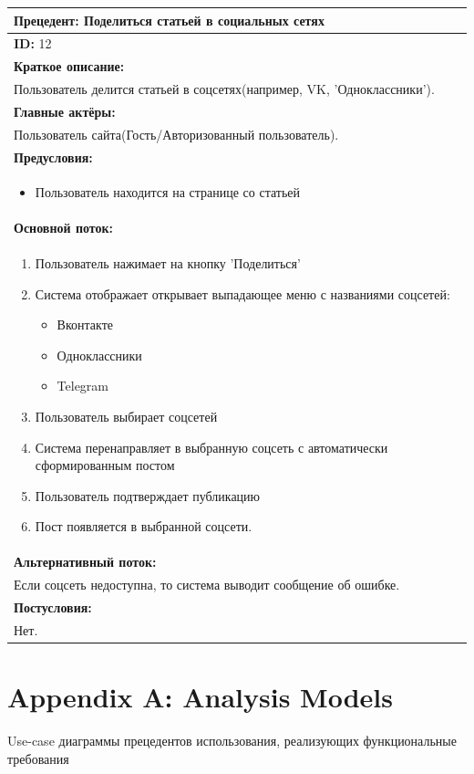 \documentclass{scrreprt}
\begin{document}
\vspace{10px}
\noindent
\begin{tabularx}{\textwidth}{|X|}
	\hline
	\textbf{Прецедент: Поделиться статьей в социальных сетях} \\
	\hline
	\textbf{ID:} 12 \\
	\hline
	\textbf{Краткое описание:} \\
	Пользователь делится статьей в соцсетях(например, VK, 'Одноклассники').\\
	\hline
	\textbf{Главные актёры:} \\
	Пользователь сайта(Гость/Авторизованный пользователь). \\
	\hline
	\textbf{Предусловия:} \\
	\begin{itemize}[nosep,leftmargin=*]
		\item Пользователь находится на странице со статьей
	\end{itemize} \\
	\hline
	\textbf{Основной поток:} \\
	\begin{enumerate}[nosep,leftmargin=*]
		\item Пользователь нажимает на кнопку 'Поделиться'
		\item Система отображает открывает выпадающее меню с названиями соцсетей:
		\begin{itemize}[]
			\item Вконтакте
			\item Одноклассники
			\item Telegram
		\end{itemize}
		\item Пользователь выбирает соцсетей
		\item Система перенаправляет в выбранную соцсеть с автоматически сформированным постом
		\item Пользователь подтверждает публикацию
		\item Пост появляется в выбранной соцсети.
	\end{enumerate} \\
	\hline
	\textbf{Альтернативный поток:} \\
	Если соцсеть недоступна, то система выводит сообщение об ошибке.\\
	\hline
	\textbf{Постусловия:} \\
	Нет. \\
	\hline
\end{tabularx}

\chapter{Appendix A: Analysis Models}
Use-case диаграммы прецедентов использования, реализующих функциональные требования
\end{document}
